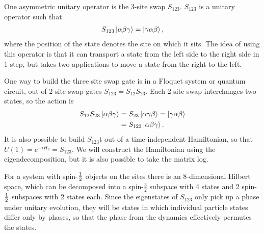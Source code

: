 One asymmetric unitary operator is the 3-site swap $S_{123}$. $S_{123}$ is a unitary operator such that
\begin{align}
S_{123}\left|\alpha\beta\gamma\right\rangle =\left|\gamma\alpha\beta\right\rangle, \label{eqn:condition}
\end{align}
where the position of the state denotes the site on which it sits. The idea of using this operator is that it can transport a state from the left side to the right side in 1 step, but takes two applications to move a state from the right to the left.

One way to build the three site swap gate is in a Floquet system or quantum circuit, out of 2-site swap gates $S_{123} = S_{12}S_{23}$. Each 2-site swap interchanges two states, so the action is 
\begin{align}
S_{12}S_{23}\left|\alpha\beta\gamma\right\rangle &= S_{23}\left|\alpha\gamma\beta\right\rangle = 
	\left|\gamma\alpha\beta\right\rangle\nonumber\\
&= S_{123}\left|\alpha\beta\gamma\right\rangle.
\end{align}
It is also possible to build $S_{123}$t out of a time-independent Hamiltonian, so that $U(1) = e^{-iH_3} = S_{123}$. We will construct the Hamiltonian using the eigendecomposition, but it is also possible to take the matrix log.

For a system with spin-$\frac{1}{2}$ objects on the sites there is an 8-dimensional Hilbert space, which can be decomposed into a spin-$\frac{3}{2}$ subspace with 4 states and 2 spin-$\frac{1}{2}$ subspaces with 2 states each. Since the eigenstates of $S_{123}$ only pick up a phase under unitary evolution, they will be states in which individual particle states differ only by phases, so that the phase from the dynamics effectively permutes the states. 

